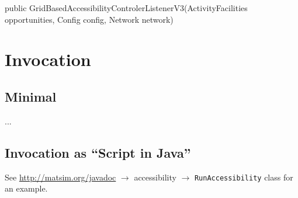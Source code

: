public GridBasedAccessibilityControlerListenerV3(ActivityFacilities opportunities, Config config, Network network)

\section{Invocation}

\subsection{Minimal}

...



\subsection{Invocation as \enquote{Script in Java}}

See \url{http://matsim.org/javadoc} $\to$ accessibility $\to$ \lstinline{RunAccessibility} class for an example.




